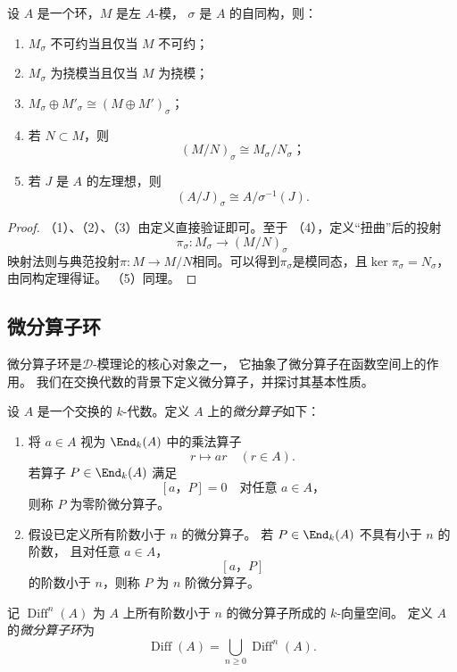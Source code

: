 \begin{proposition}
    \label{pro:twisting}
    设 $A$ 是一个环，$M$ 是左 $A$-模，
    $\sigma$ 是 $A$ 的自同构，则：
    \begin{enumerate}[label=(\arabic*)]
        \item $M_\sigma$ 不可约当且仅当 $M$ 不可约；
        \item $M_\sigma$ 为挠模当且仅当 $M$ 为挠模；
        \item $M_\sigma \oplus M'_\sigma \cong (M\oplus M')_\sigma$；
        \item 若 $N\subset M$，则
              \[
                  (M/N)_\sigma \cong M_\sigma/N_\sigma；
              \]
        \item 若 $J$ 是 $A$ 的左理想，则
              \[
                  (A/J)_\sigma \cong A/\sigma^{-1}(J).
              \]
    \end{enumerate}
    \begin{proof}
        （1）、（2）、（3）由定义直接验证即可。至于
        （4），定义“扭曲”后的投射
        \begin{equation*}
            \pi_\sigma : M_\sigma \to \left(M/N\right)_\sigma
        \end{equation*}
        映射法则与典范投射$\pi:M\to M/N$相同。可以得到$\pi _\sigma$是模同态，且$\ker \pi_\sigma=N_\sigma$，由同构定理得证。
        （5）同理。
    \end{proof}
\end{proposition}

\subsection{微分算子环}
微分算子环是$\mathcal{D}$-模理论的核心对象之一，
它抽象了微分算子在函数空间上的作用。 我们在交换代数的背景下定义微分算子，并探讨其基本性质。
\begin{definition}
    设 $A$ 是一个交换的 $k$-代数。定义 $A$ 上的\emph{微分算子}如下：
    \begin{enumerate}[label=(\roman*)]
        \item
              将 $a \in A$ 视为 $\End_k(A)$ 中的乘法算子
              \[
                  r \longmapsto ar \quad (r \in A).
              \]
              若算子 $P \in \End_k(A)$ 满足
              \[
                  [a，P]=0 \quad \text{对任意 } a\in A，
              \]
              则称 $P$ 为零阶微分算子。

        \item
              假设已定义所有阶数小于 $n$ 的微分算子。
              若 $P \in \End_k(A)$ 不具有小于 $n$ 的阶数，
              且对任意 $a \in A$，
              \[
                  [a，P]
              \]
              的阶数小于 $n$，则称 $P$ 为 $n$ 阶微分算子。
    \end{enumerate}
    记 $\operatorname{Diff}^n(A)$ 为 $A$ 上所有阶数小于 $n$
    的微分算子所成的 $k$-向量空间。
    定义 $A$ 的\emph{微分算子环}为
    \[
        \operatorname{Diff}(A)
        =
        \bigcup_{n \geq 0} \operatorname{Diff}^n(A).
    \]
\end{definition}

